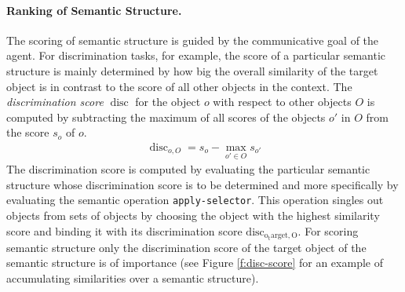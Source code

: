 \paragraph*{Ranking of Semantic Structure.}
The scoring of semantic structure is guided by the communicative goal 
of the agent. For discrimination tasks, for example, the score of a particular 
semantic structure is mainly determined by how 
big the overall similarity of the target object is in contrast to 
the score of all other objects in the context. 
The \emph{discrimination score} 
$\operatorname{disc}$ for the object $o$ with respect to other
objects $O$ is computed by subtracting the maximum
of all scores of the objects $o'$ in $O$ from the score $s_o$ of $o$.
\begin{eqnarray}
\operatorname{disc}_{o,O}=s_o - \max_{o' \in O}s_{o'}
\end{eqnarray}
The discrimination score is computed by evaluating the 
particular semantic structure whose discrimination score 
is to be determined and more specifically by evaluating the semantic operation 
{\footnotesize\tt apply-selector}. This operation singles out objects 
from sets of objects by choosing the object with the highest
similarity score and binding it with its discrimination score 
$\operatorname{disc_{o_target,O}}$. 
For scoring semantic structure only the discrimination
score of the target object of the semantic structure is
of importance (see Figure \ref{f:disc-score} for an example 
of accumulating similarities over a semantic structure).

